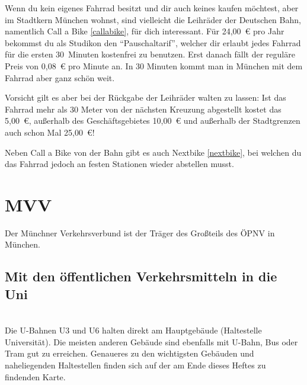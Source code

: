 Wenn du kein eigenes Fahrrad besitzt und dir auch keines kaufen möchtest, aber im
Stadtkern München wohnst, sind vielleicht die Leihräder der Deutschen Bahn,
namentlich Call a Bike \ref{callabike}, für dich interessant. Für 24,00~€ pro
Jahr bekommst du als Studikon den ``Pauschaltarif'', welcher dir erlaubt jedes
Fahrrad für die ersten 30~Minuten kostenfrei zu benutzen. Erst danach fällt der
reguläre Preis von 0,08~€ pro Minute an. In 30 Minuten kommt man in München mit dem Fahrrad
aber ganz schön weit.

Vorsicht gilt es aber bei der Rückgabe der Leihräder walten zu lassen: Ist das
Fahrrad mehr als 30 Meter von der nächsten Kreuzung abgestellt kostet das
5,00~€, außerhalb des Geschäftsgebietes 10,00~€ und außerhalb der Stadtgrenzen
auch schon Mal 25,00~€!

Neben Call a Bike von der Bahn gibt es auch Nextbike \ref{nextbike}, bei
welchen du das Fahrrad jedoch an festen Stationen wieder abstellen musst.

\begin{urlList}
\end{urlList}



\section{MVV}
Der Münchner Verkehrsverbund ist der Träger des Großteils des ÖPNV in München.

\subsection*{Mit den öffentlichen Verkehrsmitteln in die Uni}\hfill\\
Die U-Bahnen U3 und U6 halten direkt am Hauptgebäude (Haltestelle Universität).
Die meisten anderen Gebäude sind ebenfalls mit U-Bahn, Bus oder Tram gut zu
erreichen. Genaueres zu den wichtigsten Gebäuden und naheliegenden Haltestellen
finden sich auf der am Ende dieses Heftes zu findenden Karte.

